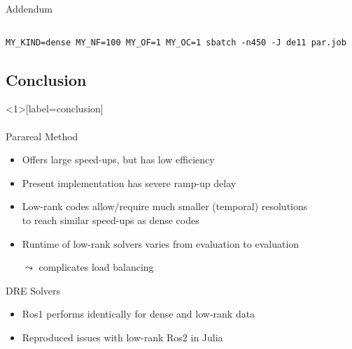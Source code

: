 \begin{frame}[b,fragile,label=speedup]{\secname}
\begin{columns}[c,onlytextwidth]
\begin{block}{Addendum}
\begin{itemize}
  \end{itemize}
  \end{block}
  {\hfill\hyperlink{app:rail1357}{}}
  \vspace{-\baselineskip}
  \end{columns}
  \onslide
  \vfill
  \begin{lstlisting}
MY_KIND=dense MY_NF=100 MY_OF=1 MY_OC=1 sbatch -n450 -J de11 par.job
  \end{lstlisting}
\end{frame}

\subsection{Conclusion}

\begin{frame}<1>[label=conclusion]{\secname}
\framesubtitle{\subsecname}
\begin{block}{Parareal Method}
  \begin{itemize}
    \item
      Offers large speed-ups, but has low efficiency
    \item
      Present implementation has severe ramp-up delay

    \item
      Low-rank codes allow/require much smaller (temporal) resolutions\\
      to reach similar speed-ups as dense codes
    \item
      Runtime of low-rank solvers varies from evaluation to evaluation

      $\leadsto$ complicates load balancing
  \end{itemize}
\end{block}
\begin{block}{DRE Solvers}
  \begin{itemize}
    \item
      Ros1 performs identically for dense and low-rank data
    \item
      Reproduced issues with low-rank Ros2 in Julia

  \end{itemize}
\end{block}
\end{frame}

